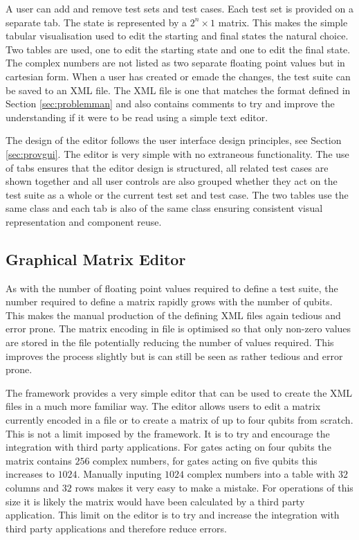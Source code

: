 A user can add and remove test sets and test cases.
Each test set is provided on a separate tab.
The state is represented by a $2^n\times{1}$ matrix.
This makes the simple tabular visualisation used to edit the starting and final states the natural choice.
Two tables are used, one to edit the starting state and one to edit the final state.
The complex numbers are not listed as two separate floating point values but in cartesian form.
When a user has created or emade the changes, the test suite can be saved to an XML file.
The XML file is one that matches the format defined in Section \ref{sec:problemman} and also contains comments to try and improve the understanding if it were to be read using a simple text editor.

The design of the editor follows the user interface design principles, see Section \ref{sec:provgui}.
The editor is very simple with no extraneous functionality.
The use of tabs ensures that the editor design is structured, all related test cases are shown together and all user controls are also grouped whether they act on the test suite as a whole or the current test set and test case.
The two tables use the same class and each tab is also of the same class ensuring consistent visual representation and component reuse.

\subsection{Graphical Matrix Editor}
\label{sec:indmatrixeditor}
As with the number of floating point values required to define a test suite, the number required to define a matrix rapidly grows with the number of qubits.
This makes the manual production of the defining XML files again tedious and error prone.
The matrix encoding in file is optimised so that only non-zero values are stored in the file potentially reducing the number of values required.
This improves the process slightly but is can still be seen as rather tedious and error prone.

The framework provides a very simple editor that can be used to create the XML files in a much more familiar way.
The editor allows users to edit a matrix currently encoded in a file or to create a matrix of up to four qubits from scratch.
This is not a limit imposed by the framework.
It is to try and encourage the integration with third party applications.
For gates acting on four qubits the matrix contains $256$ complex numbers, for gates acting on five qubits this increases to $1024$.
Manually inputing $1024$ complex numbers into a table with $32$ columns and $32$ rows makes it very easy to make a mistake.
For operations of this size it is likely the matrix would have been calculated by a third party application.
This limit on the editor is to try and increase the integration with third party applications and therefore reduce errors.

